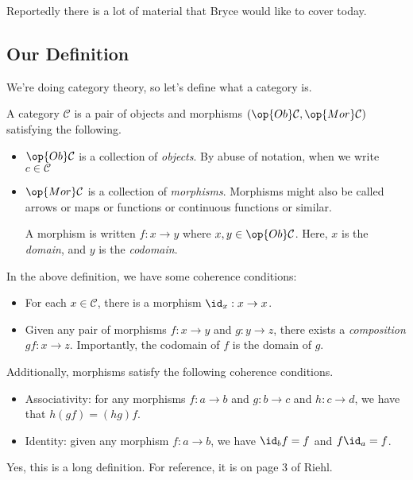 \documentclass[../notes.tex]{subfiles}
\begin{document}








Reportedly there is a lot of material that Bryce would like to cover today.

\subsection{Our Definition}
We're doing category theory, so let's define what a category is.
\begin{definition}[Category]
	A category $\mathcal C$ is a pair of objects and morphisms $(\op{Ob}\mathcal C,\op{Mor}\mathcal C)$ satisfying the following.
	\begin{itemize}
		\item $\op{Ob}\mathcal C$ is a collection of \textit{objects}. By abuse of notation, when we write $c\in\mathcal C$ 
		\item $\op{Mor}\mathcal C$ is a collection of \textit{morphisms}. Morphisms might also be called arrows or maps or functions or continuous functions or similar.

		A morphism is written $f:x\to y$ where $x,y\in\op{Ob}\mathcal C$. Here, $x$ is the \textit{domain}, and $y$ is the \textit{codomain}.
	\end{itemize}
\end{definition}
In the above definition, we have some coherence conditions:
\begin{itemize}
	\item For each $x\in\mathcal C$, there is a morphism $\id_x:x\to x$.
	\item Given any pair of morphisms $f:x\to y$ and $g:y\to z$, there exists a \textit{composition} $gf:x\to z$. Importantly, the codomain of $f$ is the domain of $g$.
\end{itemize}
Additionally, morphisms satisfy the following coherence conditions.
\begin{itemize}
	\item Associativity: for any morphisms $f:a\to b$ and $g:b\to c$ and $h:c\to d$, we have that $h(gf)=(hg)f$.
	\item Identity: given any morphism $f:a\to b$, we have $\id_bf=f$ and $f\id_a=f$.
\end{itemize}
Yes, this is a long definition. For reference, it is on page 3 of Riehl.
\end{document}
